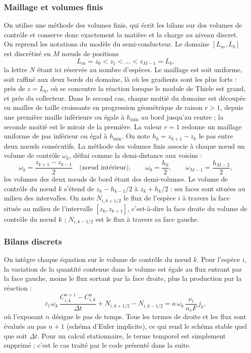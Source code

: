 \subsubsection*{Maillage et volumes finis}

On utilise une méthode des volumes finis, qui écrit les bilans sur des
volumes de contrôle et conserve donc exactement la matière et la charge au
niveau discret. On reprend les notations du modèle du semi-conducteur. Le domaine
$[L_m, L_b]$ est discrétisé en $M$ nœuds de positions
\begin{equation}
L_m = z_0 < z_1 < \dots < z_{M-1} = L_b ,
\end{equation}
la lettre $N$ étant ici réservée au nombre d'espèces. Le maillage est soit
uniforme, soit raffiné aux deux bords du domaine, là où les gradients sont
les plus forts : près de $z = L_b$, où se concentre la réaction lorsque le
module de Thiele est grand, et près du collecteur. Dans le second cas, chaque
moitié du domaine est découpée en mailles de taille croissante en progression
géométrique de raison $r > 1$, depuis une première maille inférieure ou égale
à $h_{\min}$ au bord jusqu'au centre ; la seconde moitié est le miroir de la
première. La valeur $r = 1$ redonne un maillage uniforme de pas inférieur ou
égal à $h_{\min}$. On note
$h_k = z_{k+1} - z_k$ le pas entre deux nœuds consécutifs. La méthode des
volumes finis associe à chaque nœud un volume de contrôle $\omega_k$, défini
comme la demi-distance aux voisins :
\begin{equation}
\omega_k = \frac{z_{k+1} - z_{k-1}}{2}
\quad\text{(nœud intérieur)},
\qquad
\omega_0 = \frac{h_0}{2},
\qquad
\omega_{M-1} = \frac{h_{M-2}}{2},
\label{eq:omega_ec}
\end{equation}
les volumes des deux nœuds de bord étant des demi-volumes. Le volume de
contrôle du nœud $k$ s'étend de $z_k - h_{k-1}/2$ à $z_k + h_k/2$ : ses faces
sont situées au milieu des intervalles. On note $N_{i,k+1/2}$ le flux de
l'espèce $i$ à travers la face située au milieu de l'intervalle
$[z_k, z_{k+1}]$, c'est-à-dire la face droite du volume de contrôle du
nœud $k$ ; $N_{i,k-1/2}$ est le flux à travers sa face gauche.

\subsubsection*{Bilans discrets}

On intègre chaque équation sur le volume de contrôle du nœud $k$. Pour
l'espèce $i$, la variation de la quantité contenue dans le volume est égale
au flux entrant par la face gauche, moins le flux sortant par la face droite,
plus la production par la réaction :
\begin{equation}
\varepsilon_l\, \omega_k\, \frac{C_{i,k}^{n+1} - C_{i,k}^{n}}{\Delta t}
+ N_{i,k+1/2} - N_{i,k-1/2}
= a\, \omega_k\, \frac{\nu_i}{n_eF}\, j_k ,
\label{eq:bilan_discret}
\end{equation}
où l'exposant $n$ désigne le pas de temps. Tous les termes de droite et les
flux sont évalués au pas $n+1$ (schéma d'Euler implicite), ce qui rend le
schéma stable quel que soit $\Delta t$. Pour un calcul stationnaire, le terme
temporel est simplement supprimé ; c'est le cas traité par le code présenté
dans la suite.

